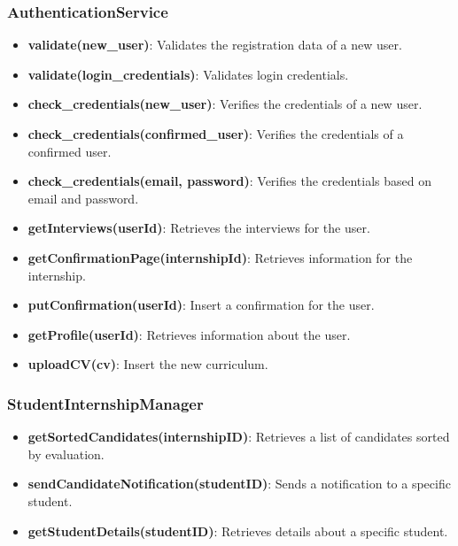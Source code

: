 \subsubsection{AuthenticationService}
\begin{itemize}
    \item \textbf{validate(new\_user)}: Validates the registration data of a new user.
    \item \textbf{validate(login\_credentials)}: Validates login credentials.
    \item \textbf{check\_credentials(new\_user)}: Verifies the credentials of a new user.
    \item \textbf{check\_credentials(confirmed\_user)}: Verifies the credentials of a confirmed user.
    \item \textbf{check\_credentials(email, password)}: Verifies the credentials based on email and password.
    \item \textbf{getInterviews(userId)}: Retrieves the interviews for the user.
    \item \textbf{getConfirmationPage(internshipId)}: Retrieves information for the internship.
    \item \textbf{putConfirmation(userId)}: Insert a confirmation for the user.
    \item \textbf{getProfile(userId)}: Retrieves information about the user.
    \item \textbf{uploadCV(cv)}: Insert the new curriculum.
\end{itemize}

\subsubsection{StudentInternshipManager}
\begin{itemize}
    \item \textbf{getSortedCandidates(internshipID)}: Retrieves a list of candidates sorted by evaluation.
    \item \textbf{sendCandidateNotification(studentID)}: Sends a notification to a specific student.
    \item \textbf{getStudentDetails(studentID)}: Retrieves details about a specific student.
\end{itemize}

